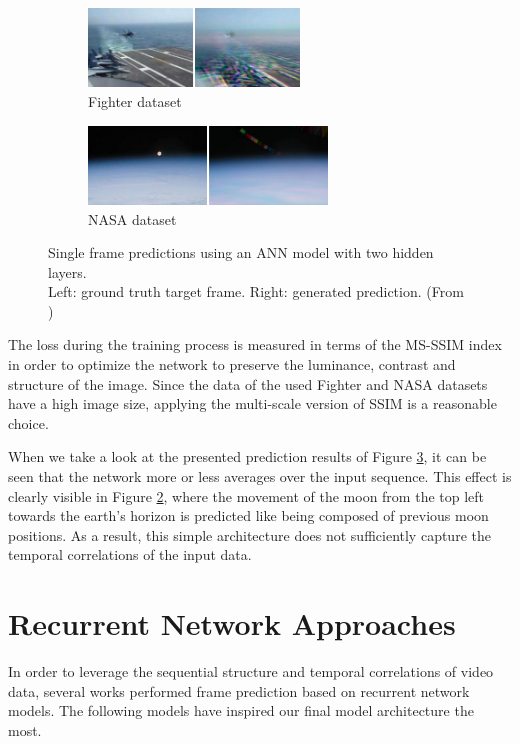 \begin{figure}[htb]
\centering
\begin{subfigure}{0.5\textwidth}
  \centering
  \includegraphics[height=2.1cm]{figures/related/fighter.png}
  \caption{Fighter dataset}
  \label{fig:aan_samples_fighter}
\end{subfigure}%
\begin{subfigure}{0.5\textwidth}
  \centering
  \includegraphics[height=2.1cm]{figures/related/nasa.png}
  \caption{NASA dataset}
  \label{fig:aan_samples_nasa}
\end{subfigure}
\caption[ANN Frame Prediction]{Single frame predictions using an ANN model with two hidden layers.\\
Left: ground truth target frame. Right: generated prediction. (From \parencite{ann})}
\label{fig:aan_samples}
\end{figure}

The loss during the training process is measured in terms of the MS-SSIM index in order to optimize the network to preserve the luminance, contrast and structure of the image. Since the data of the used Fighter and NASA datasets have a high image size, applying the multi-scale version of SSIM is a reasonable choice.

When we take a look at the presented prediction results of Figure \ref{fig:aan_samples}, it can be seen that the network more or less averages over the input sequence. This effect is clearly visible in Figure \ref{fig:aan_samples_nasa}, where the movement of the moon from the top left towards the earth's horizon is predicted like being composed of previous moon positions. As a result, this simple architecture does not sufficiently capture the temporal correlations of the input data.

\section{Recurrent Network Approaches}

In order to leverage the sequential structure and temporal correlations of video data, several works performed frame prediction based on recurrent network models. The following models have inspired our final model architecture the most.

